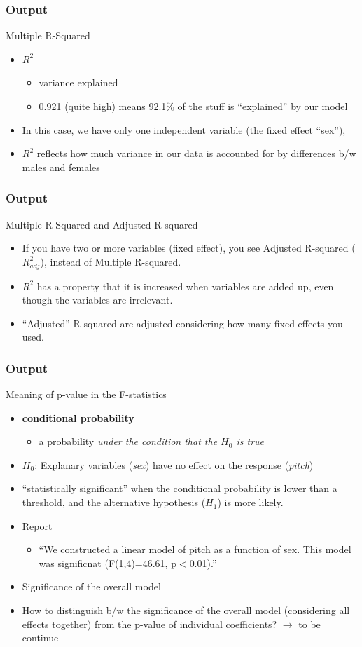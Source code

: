 \documentclass[10p]{beamer}\usepackage[]{graphicx}\usepackage[]{color}
\begin{document}
\begin{frame}
\frametitle{Output}
Multiple R-Squared
\begin{itemize}
\item $R^2$ 
	\begin{itemize}
	\item variance explained
	\item 0.921 (quite high) means 92.1\% of the stuff is ``explained'' by our model
	\end{itemize}
\item In this case, we have only one independent variable (the fixed effect ``sex''),
\item $R^2$ reflects how much variance in our data is accounted for by \alert{differences b/w males and females}
\end{itemize}
\end{frame}


\begin{frame}
\frametitle{Output}
Multiple R-Squared and Adjusted R-squared
\begin{itemize}
\item If you have two or more variables (fixed effect), you see Adjusted R-squared ($R^2_{adj}$), instead of Multiple R-squared.
\item $R^2$ has a property that it is increased when variables are added up, even though the variables are irrelevant.
\item ``Adjusted'' R-squared are adjusted considering how many fixed effects you used.
\end{itemize}
\end{frame}

\begin{frame}
\frametitle{Output}
Meaning of p-value in the F-statistics
\begin{itemize}
\item \textbf{conditional probability}
  \begin{itemize}
    \item a probability \textit{under the condition that the $H_0$ is true}
  \end{itemize}
\item $H_0$: Explanary variables (\textit{sex}) have no effect on the response (\textit{pitch})
\item ``statistically significant'' when the conditional probability is lower than a threshold, and the alternative hypothesis ($H_1$) is more likely.
\item Report
	\begin{itemize}
	\item ``We constructed a linear model of pitch as a function of sex. This model was significnat (F(1,4)=46.61, p$<$0.01).''
	\end{itemize}

\item Significance of the overall model 
\item How to distinguish b/w the significance of the overall model (considering all effects together) from the p-value of individual coefficients? $\rightarrow$ to be continue
\end{itemize}
\end{frame}
\end{document}
